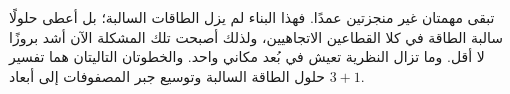 \begin{classroomqa}
\end{classroomqa}

تبقى مهمتان غير منجزتين عمدًا. فهذا البناء لم يزل الطاقات السالبة؛ بل أعطى حلولًا سالبة الطاقة في كلا القطاعين الاتجاهيين، ولذلك أصبحت تلك المشكلة الآن أشد بروزًا لا أقل. وما تزال النظرية تعيش في بُعد مكاني واحد. والخطوتان التاليتان هما تفسير حلول الطاقة السالبة وتوسيع جبر المصفوفات إلى أبعاد \(3+1\).
